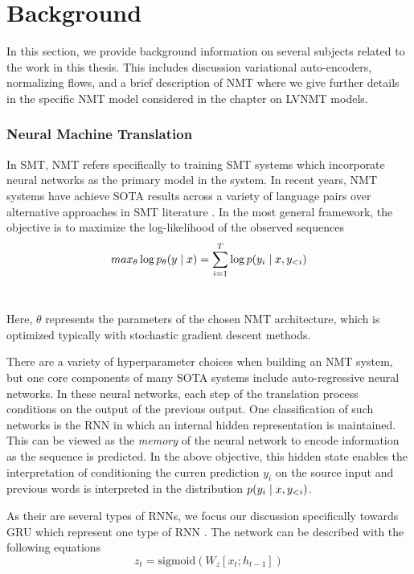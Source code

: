 \chapter{Background}

In this section, we provide background information on several subjects related to the work in this thesis. This includes discussion variational auto-encoders, normalizing flows, and a brief description of \ac{NMT} where we give further details in the specific \ac{NMT} model considered in the chapter on \ac{LVNMT} models.  



\subsection{Neural Machine Translation}

In \ac{SMT}, \ac{NMT} refers specifically to training \ac{SMT} systems which incorporate neural networks as the primary model in the system. In recent years, \ac{NMT} systems have achieve \ac{SOTA} results across a variety of language pairs over alternative approaches in \ac{SMT} literature . In the most general framework, the objective is to maximize the log-likelihood of the observed sequences 
\begin{equation}
	max_{\theta} \log p_{\theta}(y \; | \;{x})  = \sum_{i=1}^{T} \log p(y_{i} \; | \;{x, y_{<i}})
\end{equation}\

Here, $\theta$ represents the parameters of the chosen \ac{NMT} architecture, which is optimized typically with stochastic gradient descent methods. 

There are a variety of hyperparameter choices when building an \ac{NMT} system, but one core components of many \ac{SOTA} systems include auto-regressive neural networks. In these neural networks, each step of the translation process conditions on the output of the previous output. One classification of such networks is the \ac{RNN} in which an internal hidden representation is maintained. This can be viewed as the \textit{memory} of the neural network to encode information as the sequence is predicted. In the above objective, this hidden state enables the interpretation of conditioning the curren prediction $y_{i}$ on the source input and previous words is interpreted in the distribution $p(y_{i} \; | \;{x, y_{<i}})$. 

As their are several types of \ac{RNN}s, we focus our discussion specifically towards \ac{GRU} which represent one type of \ac{RNN} \cite{cho2014GRU}. The network can be described with the following equations
\begin{equation}
	z_{t} = \text{sigmoid}(W_{z}[x_{t}; h_{t-1} ] ) %
\end{equation}

